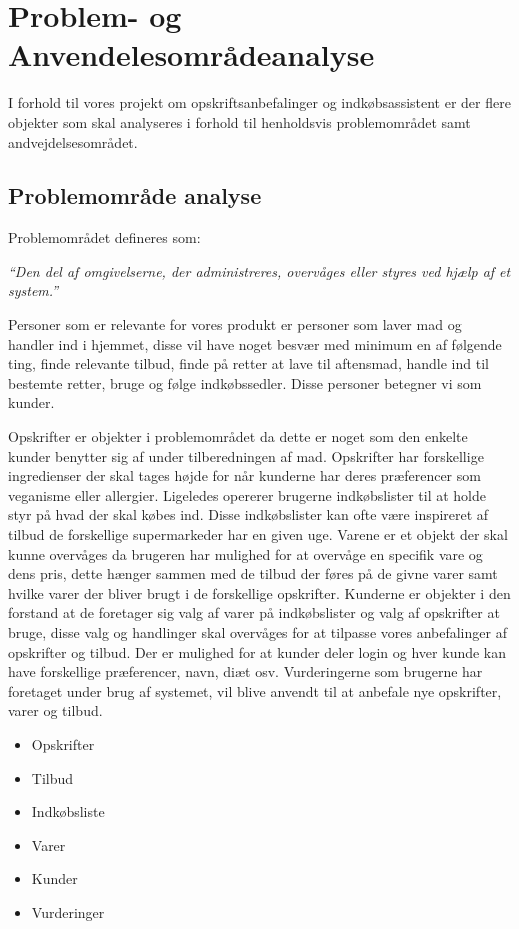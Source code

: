 \chapter{Problem- og Anvendelesområdeanalyse}

I forhold til vores projekt om opskriftsanbefalinger og indkøbsassistent er der flere objekter som skal analyseres i forhold til henholdsvis problemområdet samt andvejdelsesområdet.

\section{Problemområde analyse}
Problemområdet defineres som:

\textit{``Den del af omgivelserne, der administreres, overvåges eller styres ved hjælp af et system.''}

Personer som er relevante for vores produkt er personer som laver mad og handler ind i hjemmet, disse vil have noget besvær med minimum en af følgende ting, finde relevante tilbud, finde på retter at lave til aftensmad, handle ind til bestemte retter, bruge og følge indkøbssedler.
Disse personer betegner vi som kunder.

Opskrifter er objekter i problemområdet da dette er noget som den enkelte kunder benytter sig af under tilberedningen af mad.
Opskrifter har forskellige ingredienser der skal tages højde for når kunderne har deres præferencer som veganisme eller allergier.
Ligeledes opererer brugerne indkøbslister til at holde styr på hvad der skal købes ind.
Disse indkøbslister kan ofte være inspireret af tilbud de forskellige supermarkeder har en given uge.
Varene er et objekt der skal kunne overvåges da brugeren har mulighed for at overvåge en specifik vare og dens pris, dette hænger sammen med de tilbud der føres på de givne varer samt hvilke varer der bliver brugt i de forskellige opskrifter.
Kunderne er objekter i den forstand at de foretager sig valg af varer på indkøbslister og valg af opskrifter at bruge, disse valg og handlinger skal overvåges for at tilpasse vores anbefalinger af opskrifter og tilbud.
Der er mulighed for at kunder deler login og hver kunde kan have forskellige præferencer, navn, diæt osv.
Vurderingerne som brugerne har foretaget under brug af systemet, vil blive anvendt til at anbefale nye opskrifter, varer og tilbud.

\begin{itemize}
	\item Opskrifter
	\item Tilbud
	\item Indkøbsliste
	\item Varer
	\item Kunder
	\item Vurderinger 
\end{itemize}
                                                                                                                                                                                                   
